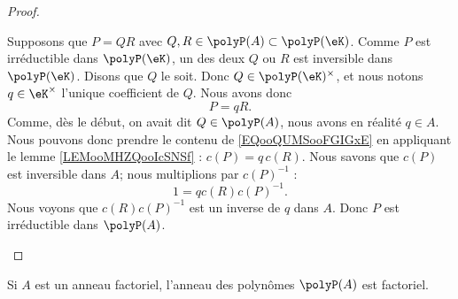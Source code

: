 \begin{proof}
\begin{subproof}
		Supposons que \( P=QR\) avec \( Q,R\in\polyP(A)\subset\polyP(\eK)\). Comme \( P\) est irréductible dans \( \polyP(\eK)\), un des deux \( Q\) ou \( R\) est inversible dans \( \polyP(\eK)\). Disons que \( Q\) le soit. Donc \( Q\in\polyP(\eK)^{\times}\), et nous notons \( q\in \eK^{\times}\) l'unique coefficient de \( Q\). Nous avons donc
		\begin{equation}		\label{EQooQUMSooFGIGxE}
			P=qR.
		\end{equation}
		Comme, dès le début, on avait dit \( Q\in\polyP(A)\), nous avons en réalité \( q\in A\). Nous pouvons donc prendre le contenu de \eqref{EQooQUMSooFGIGxE} en appliquant le lemme \ref{LEMooMHZQooIcSNSf} : \( c(P)=q\,c(R)\). Nous savons que \( c(P)\) est inversible dans \( A\); nous multiplions par \( c(P)^{-1}\) :
		\begin{equation}
			1=qc(R)c(P)^{-1}.
		\end{equation}
		Nous voyons que \( c(R)c(P)^{-1}\) est un inverse de \( q\) dans \( A\). Donc \( P\) est irréductible dans \( \polyP(A)\).
	\end{subproof}
\end{proof}

\begin{theorem}		\label{THOooVZUBooNSvcBr}
	Si \( A\) est un anneau factoriel, l'anneau des polynômes \( \polyP(A)\) est factoriel.
\end{theorem}

